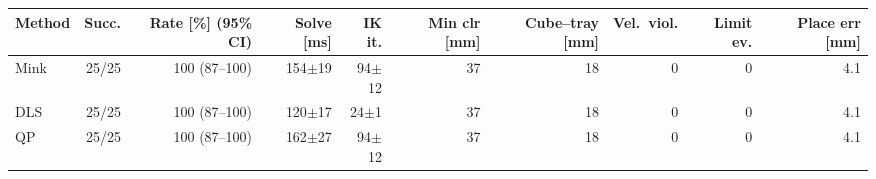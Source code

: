 \begin{tabular}{lrrrrrrrrr}
\toprule
Method & Succ. & Rate [\%] (95\% CI) & Solve [ms] & IK it. & Min clr [mm] & Cube--tray [mm] & Vel.\ viol. & Limit ev. & Place err [mm]\\
\midrule
Mink & 25/25 & 100 (87--100) & 154$\pm$19 & 94$\pm$12 & 37 & 18 & 0 & 0 & 4.1\\
DLS & 25/25 & 100 (87--100) & 120$\pm$17 & 24$\pm$1 & 37 & 18 & 0 & 0 & 4.1\\
QP & 25/25 & 100 (87--100) & 162$\pm$27 & 94$\pm$12 & 37 & 18 & 0 & 0 & 4.1\\
\bottomrule
\end{tabular}
